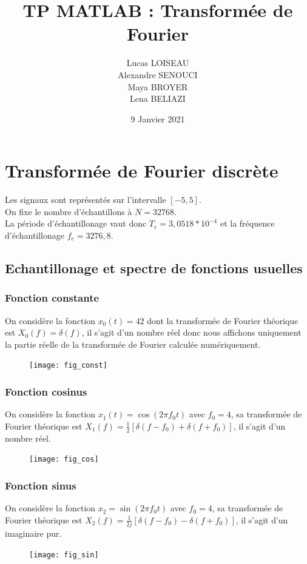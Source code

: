 \documentclass{article}
\title{TP MATLAB : Transformée de Fourier}
\date{9 Janvier 2021}
\author{Lucas LOISEAU \\ Alexandre SENOUCI \\ Maya BROYER \\ Lena BELIAZI}
\begin{document}
\maketitle
\section{Transformée de Fourier discrète}
Les signaux sont représentés sur l'intervalle $[-5,5]$. \\
On fixe le nombre d'échantillons à $N=32768$. \\
La période d'échantillonage vaut donc $T_e = 3,0518 * 10^{-4}$ et la fréquence d'échantillonage $f_e=3276,8$.
\subsection{Echantillonage et spectre de fonctions usuelles}
\subsubsection{Fonction constante}
On considère la fonction $x_0(t)=42$ dont la transformée de Fourier théorique est $X_0(f)=\delta(f)$, il s'agit d'un nombre réel donc nous affichons uniquement la partie réelle de la transformée de Fourier calculée numériquement.
\begin{figure}[h]
\texttt{[image: fig\_const]}
\centering
\end{figure}
\subsubsection{Fonction cosinus}
On considère la fonction $x_1(t)=\cos(2\pi f_0 t)$ avec $f_0=4$, sa transformée de Fourier théorique est $X_1(f)=\frac{1}{2}[\delta(f-f_0)+\delta(f+f_0)]$, il s'agit d'un nombre réel.

\begin{figure}[h]
\texttt{[image: fig\_cos]}
\centering
\end{figure}

\subsubsection{Fonction sinus}
On considère la fonction $x_2=\sin(2\pi f_0 t)$ avec $f_0=4$, sa transformée de Fourier théorique est $X_2(f)=\frac{1}{2j}[\delta(f-f_0)-\delta(f+f_0)]$, il s'agit d'un imaginaire pur.
\begin{figure}[h]
\texttt{[image: fig\_sin]}
\centering
\end{figure}
\end{document}

